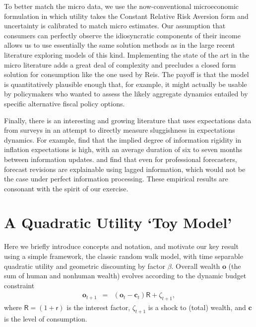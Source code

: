 \documentclass[titlepage]{./econtex}
\begin{document}
To better match the micro data, we use the now-conventional microeconomic formulation in which utility takes the Constant Relative Risk Aversion form and uncertainty is calibrated to match micro estimates.  Our assumption that consumers can perfectly observe the idiosyncratic components of their income allows us to use essentially the same solution methods as in the large recent literature exploring models of this kind.
Implementing the state of the art in the micro literature adds a great deal of complexity and precludes a closed form solution for consumption like the one used by Reis. The payoff is that the model is quantitatively plausible enough that, for example, it might actually be usable by policymakers who wanted to assess the likely aggregate dynamics entailed by specific alternative fiscal policy options.

Finally, there is an interesting and growing literature that uses expectations data from surveys in an attempt to directly measure sluggishness in expectations dynamics.
For example, \cite{coibGor:AER15} find that the implied degree of information rigidity in inflation expectations is high, with an average duration of six to seven months between information updates. \cite{fuhrer:JME17} and \cite{fuhrerIntrinsicPersistence} find that even for professional forecasters, forecast revisions are explainable using lagged information, which would not be the case under perfect information processing.  These empirical results are consonant with the spirit of our exercise.

\section{A Quadratic Utility `Toy Model'}\label{sec:Quadratic}

Here we briefly introduce concepts and notation, and motivate our key result using a simple framework, the classic \cite{hallRandomWalk} random walk model, with time separable quadratic utility and geometric discounting by factor $\beta$.  Overall wealth $\mathbf{o}$ (the sum of human and nonhuman wealth) evolves according to the dynamic budget constraint
\begin{eqnarray}
  \mathbf{o}_{t+1} & = & (\mathbf{o}_{t}-\mathbf{c}_{t})\mathsf{R}+\zeta_{t+1}, \label{eq:zAccum}
\end{eqnarray}
 where $\mathsf{R}=(1+\mathsf{r})$ is the interest factor, $\zeta_{t+1}$ is a shock to (total) wealth, and $\mathbf{c}$ is the level of consumption.
\end{document}
